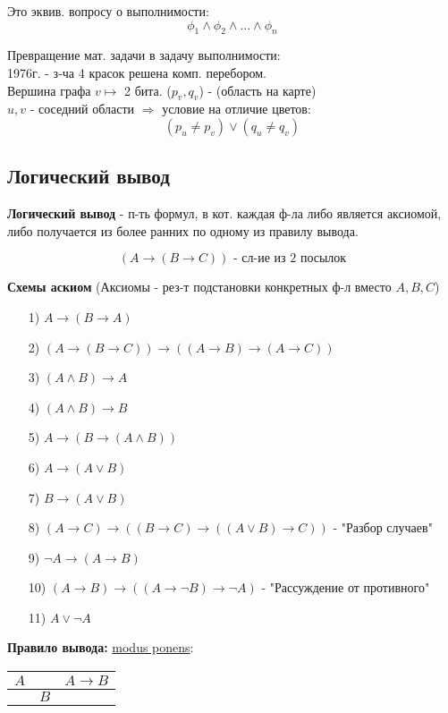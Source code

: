 Это эквив. вопросу о выполнимости:
\[
  \phi_1 \land \phi_2 \land \ldots \land \phi_n
\]
\begin{example}
Превращение мат. задачи в задачу выполнимости: \\
1976г. - з-ча 4 красок решена комп. перебором. \\ 
Вершина графа $v \mapsto $ 2 бита. ($p_v, q_v$) - (область на карте) \\
$u, v$ - соседний области $\Rightarrow$ условие на отличие цветов:
\[
  (p_u \neq p_v) \lor (q_u \neq q_v)
\]
\end{example}
\subsection{Логический вывод}
\begin{definition}
\textbf{Логический вывод} - п-ть формул, в кот. каждая ф-ла либо является аксиомой, либо получается из более ранних по одному из правилу вывода.
\end{definition}

\begin{note}
  \[
    (A \rightarrow (B \rightarrow C)) \text{ - сл-ие из 2 посылок}
  \]
\end{note}
\textbf{Схемы аскиом} (Аксиомы - рез-т подстановки конкретных ф-л вместо $A, B, C$)
\begin{itemize}
  \item [1) ] $A \rightarrow (B \rightarrow A)$
  \item [2) ] $(A \rightarrow (B \rightarrow C)) \rightarrow ((A \rightarrow B) \rightarrow (A \rightarrow C))$
  \item [3) ] $(A \land B) \rightarrow A$
  \item [4) ] $(A \land B) \rightarrow B$
  \item [5) ] $A \rightarrow (B \rightarrow (A \land B))$
  \item [6) ] $A \rightarrow (A \lor B)$
  \item [7) ] $B \rightarrow (A \lor B)$
  \item [8) ] $(A \rightarrow C) \rightarrow ((B \rightarrow C) \rightarrow ((A \lor B) \rightarrow C))$ - "Разбор случаев"
  \item [9) ] $\neg A \rightarrow (A \rightarrow B)$
  \item [10) ] $(A \rightarrow B) \rightarrow ((A \rightarrow \neg B) \rightarrow \neg A)$ - "Рассуждение от противного"
  \item [11) ] $A \lor \neg A$
\end{itemize}
  \textbf{Правило вывода:} \underline{modus ponens}:
  \begin{center}
  \begin{tabular}{ c c c } 
    $A$ & & $A \rightarrow B$ \\ 
   \hline
      & $B$ &
  \end{tabular}
  \end{center}

